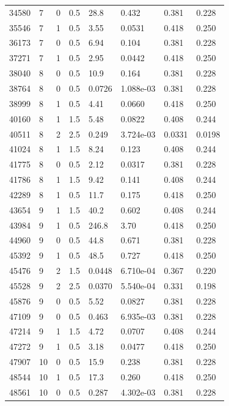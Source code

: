 \documentclass[preview]{standalone}
\begin{document}
{{{\begin{tabular}{L{1.2cm}C{1.2cm} C{0.3cm}C{0.5cm} C{1.4cm}C{1.4cm} C{1.4cm}C{1.4cm}}
  34580  &     7  & 0     & 0.5 &  28.8  & 0.432  & 0.381 &  0.228   \\ 
  35546  &     7  & 1     & 0.5 &  3.55  & 0.0531  & 0.418 &  0.250   \\ 
  36173  &     7  & 0     & 0.5 &  6.94  & 0.104  & 0.381 &  0.228   \\ 
  37271  &     7  & 1     & 0.5 &  2.95  & 0.0442  & 0.418 &  0.250   \\ 
  38040  &     8  & 0     & 0.5 &  10.9  & 0.164  & 0.381 &  0.228   \\ 
  38764  &     8  & 0     & 0.5 &  0.0726  & 1.088e-03  & 0.381 &  0.228   \\ 
  38999  &     8  & 1     & 0.5 &  4.41  & 0.0660  & 0.418 &  0.250   \\ 
  40160  &     8  & 1     & 1.5 &  5.48  & 0.0822  & 0.408 &  0.244   \\ 
  40511  &     8  & 2     & 2.5 &  0.249  & 3.724e-03  & 0.0331 &  0.0198   \\ 
  41024  &     8  & 1     & 1.5 &  8.24  & 0.123  & 0.408 &  0.244   \\ 
  41775  &     8  & 0     & 0.5 &  2.12  & 0.0317  & 0.381 &  0.228   \\ 
  41786  &     8  & 1     & 1.5 &  9.42  & 0.141  & 0.408 &  0.244   \\ 
  42289  &     8  & 1     & 0.5 &  11.7  & 0.175  & 0.418 &  0.250   \\ 
  43654  &     9  & 1     & 1.5 &  40.2  & 0.602  & 0.408 &  0.244   \\ 
  43984  &     9  & 1     & 0.5 &  246.8  & 3.70  & 0.418 &  0.250   \\ 
  44960  &     9  & 0     & 0.5 &  44.8  & 0.671  & 0.381 &  0.228   \\ 
  45392  &     9  & 1     & 0.5 &  48.5  & 0.727  & 0.418 &  0.250   \\ 
  45476  &     9  & 2     & 1.5 &  0.0448  & 6.710e-04  & 0.367 &  0.220   \\ 
  45528  &     9  & 2     & 2.5 &  0.0370  & 5.540e-04  & 0.331 &  0.198   \\ 
  45876  &     9  & 0     & 0.5 &  5.52  & 0.0827  & 0.381 &  0.228   \\ 
  47109  &     9  & 0     & 0.5 &  0.463  & 6.935e-03  & 0.381 &  0.228   \\ 
  47214  &     9  & 1     & 1.5 &  4.72  & 0.0707  & 0.408 &  0.244   \\ 
  47272  &     9  & 1     & 0.5 &  3.18  & 0.0477  & 0.418 &  0.250   \\ 
  47907  &    10  & 0     & 0.5 &  15.9  & 0.238  & 0.381 &  0.228   \\ 
  48544  &    10  & 1     & 0.5 &  17.3  & 0.260  & 0.418 &  0.250   \\ 
  48561  &    10  & 0     & 0.5 &  0.287  & 4.302e-03  & 0.381 &  0.228   \\ 
\hline 
\end{tabular} 

}}}
\end{document}

